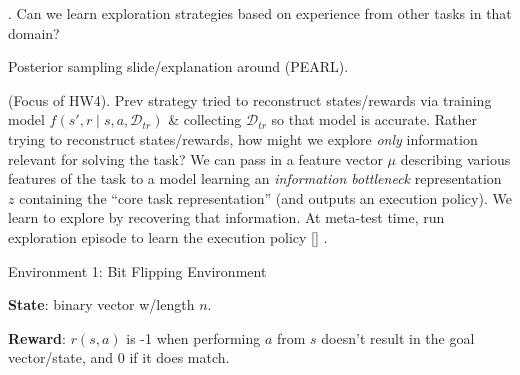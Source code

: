 \documentclass[11pt]{article}
\begin{document}
. Can we learn exploration strategies based on experience from other tasks in that domain?
 

Posterior sampling slide/explanation around  (PEARL). 

 (Focus of HW4). Prev strategy tried to reconstruct states/rewards via training model $f(s', r \mid s, a, \mathcal{D}_{tr})$ \& collecting $\mathcal{D}_{tr}$ so that model is accurate. Rather trying to reconstruct states/rewards, how might we explore \textit{only} information relevant for solving the task? We can pass in a feature vector $\mu$ describing various features of the task to a model learning an \textit{information bottleneck} representation $z$ containing the ``core task representation'' (and outputs an execution policy). We learn to explore by recovering that information. At meta-test time, run exploration episode to learn the execution policy [] . 

 
 
 
 
 
 
 
 
 
 
 
 
 
 
 
 
 
 
 
 
 
 
 
 
 
 
 
 
 
 
 
 
 
 
 
 
 
 
 
 
 
 
 
 
 
 
 \label{Homework}
 




\begin{itemdefinition}{Environment 1: Bit Flipping Environment}{}
	\item \textbf{State}: binary vector w/length $n$. 
	\item \textbf{Reward}: $r(s, a)$ is -1 when performing $a$ from $s$ doesn't result in the goal vector/state, and 0 if it does match.
\end{itemdefinition}
\end{document}
